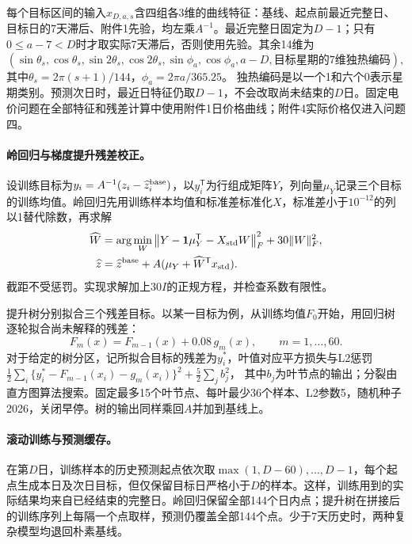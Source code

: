 每个目标区间的输入$x_{D,a,s}$含四组各3维的曲线特征：基线、起点前最近完整日、目标日的7天滞后、附件1先验，均左乘$A^{-1}$。最近完整日固定为$D-1$；只有$0\le a-7<D$时才取实际7天滞后，否则使用先验。其余14维为
\begin{equation}
 (\sin\theta_s,\cos\theta_s,\sin2\theta_s,\cos2\theta_s,
   \sin\phi_a,\cos\phi_a,a-D,\text{目标星期的7维独热编码}),
\end{equation}
其中$\theta_s=2\pi(s+1)/144$，$\phi_a=2\pi a/365.25$。
独热编码是以一个1和六个0表示星期类别。预测次日时，最近日特征仍取$D-1$，不会改取尚未结束的$D$日。固定电价问题在全部特征和残差计算中使用附件1日价格曲线；附件4实际价格仅进入问题四。

\paragraph{岭回归与梯度提升残差校正。}
设训练目标为$y_i=A^{-1}(z_i-\widehat z_i^{\rm base})$，以$y_i^{\mathsf T}$为行组成矩阵$Y$，列向量$\mu_Y$记录三个目标的训练均值。岭回归先用训练样本均值和标准差标准化$X$，标准差小于$10^{-12}$的列以1替代除数，再求解
\begin{align}
 \widehat W&=\arg\min_W\left\|Y-\bm1\mu_Y^{\mathsf T}-X_{\rm std}W\right\|_F^2
                       +30\|W\|_F^2,\\
 \widehat z&=\widehat z^{\rm base}+A(\mu_Y+\widehat W^{\mathsf T}x_{\rm std}).
\end{align}
截距不受惩罚。实现求解加上$30I$的正规方程，并检查系数有限性。

提升树分别拟合三个残差目标。以某一目标为例，从训练均值$F_0$开始，用回归树逐轮拟合尚未解释的残差：
\begin{equation}
 F_m(x)=F_{m-1}(x)+0.08\,g_m(x),\qquad m=1,\ldots,60.
\end{equation}
对于给定的树分区，记所拟合目标的残差为$y_i^{\ast}$，叶值对应平方损失与L2惩罚
$\frac12\sum_i\{y_i^{\ast}-F_{m-1}(x_i)-g_m(x_i)\}^2+\frac52\sum_j b_j^2$，
其中$b_j$为叶节点的输出；分裂由直方图算法搜索。固定最多15个叶节点、每叶最少36个样本、L2参数5，随机种子2026，关闭早停。树的输出同样乘回$A$并加到基线上。

\paragraph{滚动训练与预测缓存。}
在第$D$日，训练样本的历史预测起点依次取$\max(1,D-60),\ldots,D-1$，每个起点生成本日及次日目标，但仅保留目标日严格小于$D$的样本。这样，训练用到的实际结果均来自已经结束的完整日。岭回归保留全部144个日内点；提升树在拼接后的训练序列上每隔一个点取样，预测仍覆盖全部144个点。少于7天历史时，两种复杂模型均退回朴素基线。

